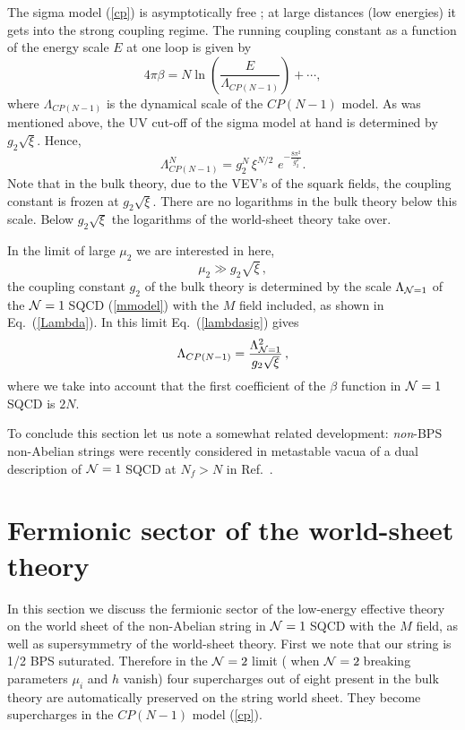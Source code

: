 \documentclass[epsfig,12pt]{article}
\def\beq{\begin{equation}}
\def\eeq{\end{equation}}
\newcommand{\ntwo}{${\cal N}=2\;$}
\newcommand{\none}{${\cal N}=1\;$}
\begin{document}
The sigma model (\ref{cp}) is asymptotically free \cite{Po3}; at large distances 
(low energies) it gets into the strong coupling regime.  The  running
coupling constant  as a function of the energy scale $E$ at one loop is given by
\beq
4\pi \beta = N\ln {\left(\frac{E}{\Lambda_{CP(N-1)}}\right)}
+\cdots,
\label{sigmacoup}
\eeq
where $\Lambda_{CP(N-1)}$ is the dynamical scale of the $CP(N-1)$
model. As was mentioned above,
the UV cut-off of the sigma model at hand
is determined by  $g_2\sqrt{\xi}$.
Hence,
\beq
\Lambda^N_{CP(N-1)} = g_2^N\, \xi^{N/2} \,\, e^{-\frac{8\pi^2}{g^2_2}} .
\label{lambdasig}
\eeq
Note that in the bulk theory, due to the VEV's of
the squark fields, the coupling constant is frozen at
$g_2\sqrt{\xi}$. There are no logarithms in the bulk theory
below this scale. Below $g_2\sqrt{\xi}$ the logarithms of the
world-sheet  theory take over.

In the limit of large $\mu_2$ we are interested in here,
$$
\mu_2\gg g_2\sqrt{\xi}\,,
$$
the coupling constant $g_2$ of
the  bulk theory is determined by the scale $\Lambda_{{\cal N}=1}$ of
the \none SQCD (\ref{mmodel}) with the $M$ field included, as shown 
in Eq.~(\ref{Lambda}). In this limit Eq.~(\ref{lambdasig}) gives
\beq
\Lambda_{CP(N-1)}=\frac{\Lambda_{{\cal N}=1}^2}{g_2\sqrt{\xi}}\,,
\label{cpscale}
\eeq
where we take into account  that the first coefficient of the $\beta$ function
in \none  SQCD is $2N$. 

To conclude this section let us note a somewhat related development:
{\em non}-BPS non-Abelian strings were recently
considered in metastable vacua of a dual description of \none SQCD at $N_f>N$ in
Ref.~\cite{Jmeta}.

\section{Fermionic sector of the world-sheet theory}
\label{ferm}
\setcounter{equation}{0}




In this section we discuss the fermionic sector of the low-energy effective
theory on the world sheet of the non-Abelian string in \none SQCD with the $M$ field,
as well as supersymmetry of the world-sheet theory. First we note that our string is 
1/2 BPS suturated. Therefore in the \ntwo limit ( when \ntwo  breaking
parameters $\mu_i$ and $h$ vanish) four supercharges out of eight present in the bulk 
theory are automatically 
preserved on the string world sheet. They become supercharges 
in the  $CP(N-1)$ model (\ref{cp}).
\end{document}

